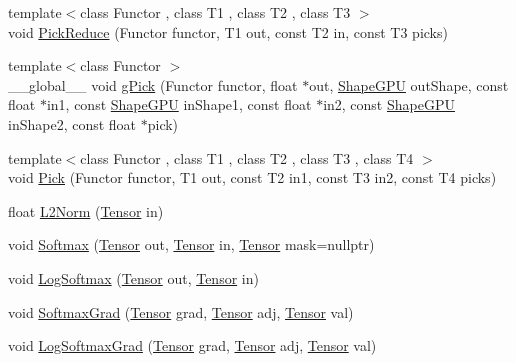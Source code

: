 \begin{DoxyCompactItemize}
\item 
{\footnotesize template$<$class Functor , class T1 , class T2 , class T3 $>$ }\\void \hyperlink{namespacemarian_a5d3645642f3d84d3109b851c5b5ce6f7}{Pick\+Reduce} (Functor functor, T1 out, const T2 in, const T3 picks)
\item 
{\footnotesize template$<$class Functor $>$ }\\\+\_\+\+\_\+global\+\_\+\+\_\+ void \hyperlink{namespacemarian_ae50ba9da16682ded79ad115d7883d49e}{g\+Pick} (Functor functor, float $\ast$out, \hyperlink{structmarian_1_1ShapeGPU}{Shape\+G\+PU} out\+Shape, const float $\ast$in1, const \hyperlink{structmarian_1_1ShapeGPU}{Shape\+G\+PU} in\+Shape1, const float $\ast$in2, const \hyperlink{structmarian_1_1ShapeGPU}{Shape\+G\+PU} in\+Shape2, const float $\ast$pick)
\item 
{\footnotesize template$<$class Functor , class T1 , class T2 , class T3 , class T4 $>$ }\\void \hyperlink{namespacemarian_a4dcaa19981e73d7875242f2ae1fdd11c}{Pick} (Functor functor, T1 out, const T2 in1, const T3 in2, const T4 picks)
\item 
float \hyperlink{namespacemarian_ae46885b8c35f2b67a2dc65f71e0e4efd}{L2\+Norm} (\hyperlink{namespacemarian_a88b71ec34bb354564cddc24eb80f7e14}{Tensor} in)
\item 
void \hyperlink{namespacemarian_a01a45889e366b16c79c2cc067f534021}{Softmax} (\hyperlink{namespacemarian_a88b71ec34bb354564cddc24eb80f7e14}{Tensor} out, \hyperlink{namespacemarian_a88b71ec34bb354564cddc24eb80f7e14}{Tensor} in, \hyperlink{namespacemarian_a88b71ec34bb354564cddc24eb80f7e14}{Tensor} mask=nullptr)
\item 
void \hyperlink{namespacemarian_a9dd94a109bd8ccf8e8269bd1d7a86c18}{Log\+Softmax} (\hyperlink{namespacemarian_a88b71ec34bb354564cddc24eb80f7e14}{Tensor} out, \hyperlink{namespacemarian_a88b71ec34bb354564cddc24eb80f7e14}{Tensor} in)
\item 
void \hyperlink{namespacemarian_a7da9b69aeeeb493a8c19c3e07b831a92}{Softmax\+Grad} (\hyperlink{namespacemarian_a88b71ec34bb354564cddc24eb80f7e14}{Tensor} grad, \hyperlink{namespacemarian_a88b71ec34bb354564cddc24eb80f7e14}{Tensor} adj, \hyperlink{namespacemarian_a88b71ec34bb354564cddc24eb80f7e14}{Tensor} val)
\item 
void \hyperlink{namespacemarian_a4f9d12af1543fda2c0f22dce56050aba}{Log\+Softmax\+Grad} (\hyperlink{namespacemarian_a88b71ec34bb354564cddc24eb80f7e14}{Tensor} grad, \hyperlink{namespacemarian_a88b71ec34bb354564cddc24eb80f7e14}{Tensor} adj, \hyperlink{namespacemarian_a88b71ec34bb354564cddc24eb80f7e14}{Tensor} val)

\end{DoxyCompactItemize}
